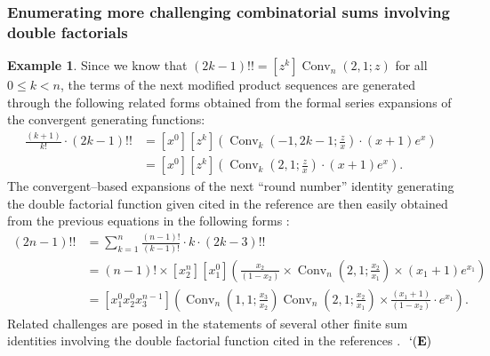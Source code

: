 \documentclass[12pt,reqno]{article}
\numberwithin{sfootnote}{section}
\numberwithin{equation}{section}
\theoremstyle{DefaultTheoremStyle}
\theoremstyle{definition}
\newtheorem{example}[theorem]{Example}
\newcommand{\eolqedsymbol}[1]{{\hrulefill\ensuremath{\ #1}}}
\renewcommand{\eolqedsymbol}[1]{{\mboxfill{ }\ensuremath{\ #1}}}
\newcommand{\ExampleQEDSymbol}{`(\text{\rm{\bf E}})}
\newcommand{\ExampleQED}{\eolqedsymbol{\ExampleQEDSymbol}}
\newcommand{\quotetext}[1]{``#1''}
\newcommand{\ConvGF}[4]{\ensuremath{\Conv_{#1}\left(#2, #3; #4\right)}}
\DeclareMathOperator{\Conv}{Conv}
\begin{document}
\subsubsection{Enumerating more challenging combinatorial sums involving 
               double factorials} 

\begin{example} 
\label{example_SumsInvolving_DblFactFns-exps_examples_v1} 
Since we know that $(2k-1)!! = [z^k] \ConvGF{n}{2}{1}{z}$ 
for all $0 \leq k < n$, the terms of the next 
modified product sequences are generated through the 
following related forms obtained from the formal series 
expansions of the convergent generating functions: 
\begin{align*} 
\frac{(k+1)}{k!} \cdot (2k-1)!! & = 
     [x^0] [z^k] \left( 
     \ConvGF{k}{-1}{2k-1}{\frac{z}{x}} \cdot (x+1) e^{x} 
     \right) \\ 
     & = 
     [x^0] [z^k] \left( 
     \ConvGF{k}{2}{1}{\frac{z}{x}} \cdot (x+1) e^{x} 
     \right). 
\end{align*} 
The convergent--based expansions of the next \quotetext{round number} identity 
generating the double factorial function given cited in the reference 
are then easily obtained from the 
previous equations in the following forms 
\citep[\S 4.3]{DBLFACTFN-COMBIDENTS-SURVEY}: 
\begin{align*} 
(2n-1)!! & = 
     \sum_{k=1}^{n} \frac{(n-1)!}{(k-1)!} \cdot k \cdot (2k-3)!! \\ 
     & = 
     (n-1)! \times [x_2^{n}] [x_1^0] \left( 
     \frac{x_2}{(1-x_2)} \times \ConvGF{n}{2}{1}{\frac{x_2}{x_1}} \times 
     (x_1+1) e^{x_1} 
     \right) \\ 
     & = 
     [x_1^0 x_2^0 x_3^{n-1}] \left( 
     \ConvGF{n}{1}{1}{\frac{x_3}{x_2}} 
     \ConvGF{n}{2}{1}{\frac{x_2}{x_1}} \times 
     \frac{(x_1+1)}{(1-x_2)} \cdot e^{x_1} 
     \right). 
\end{align*} 
Related challenges are posed in the statements of several other 
finite sum identities involving the double factorial function cited in the 
references \citep{MAA-FUN-WITH-DBLFACT,DBLFACTFN-COMBIDENTS-SURVEY}. 
\ExampleQED 
\end{example} 
\end{document}
